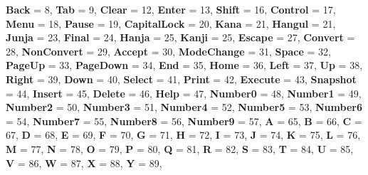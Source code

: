 \begin{DoxyCompactItemize}
{\bfseries Back} = 8, 
{\bfseries Tab} = 9, 
{\bfseries Clear} = 12, 
\newline
{\bfseries Enter} = 13, 
{\bfseries Shift} = 16, 
{\bfseries Control} = 17, 
{\bfseries Menu} = 18, 
\newline
{\bfseries Pause} = 19, 
{\bfseries Capital\+Lock} = 20, 
{\bfseries Kana} = 21, 
{\bfseries Hangul} = 21, 
\newline
{\bfseries Junja} = 23, 
{\bfseries Final} = 24, 
{\bfseries Hanja} = 25, 
{\bfseries Kanji} = 25, 
\newline
{\bfseries Escape} = 27, 
{\bfseries Convert} = 28, 
{\bfseries Non\+Convert} = 29, 
{\bfseries Accept} = 30, 
\newline
{\bfseries Mode\+Change} = 31, 
{\bfseries Space} = 32, 
{\bfseries Page\+Up} = 33, 
{\bfseries Page\+Down} = 34, 
\newline
{\bfseries End} = 35, 
{\bfseries Home} = 36, 
{\bfseries Left} = 37, 
{\bfseries Up} = 38, 
\newline
{\bfseries Right} = 39, 
{\bfseries Down} = 40, 
{\bfseries Select} = 41, 
{\bfseries Print} = 42, 
\newline
{\bfseries Execute} = 43, 
{\bfseries Snapshot} = 44, 
{\bfseries Insert} = 45, 
{\bfseries Delete} = 46, 
\newline
{\bfseries Help} = 47, 
{\bfseries Number0} = 48, 
{\bfseries Number1} = 49, 
{\bfseries Number2} = 50, 
\newline
{\bfseries Number3} = 51, 
{\bfseries Number4} = 52, 
{\bfseries Number5} = 53, 
{\bfseries Number6} = 54, 
\newline
{\bfseries Number7} = 55, 
{\bfseries Number8} = 56, 
{\bfseries Number9} = 57, 
{\bfseries A} = 65, 
\newline
{\bfseries B} = 66, 
{\bfseries C} = 67, 
{\bfseries D} = 68, 
{\bfseries E} = 69, 
\newline
{\bfseries F} = 70, 
{\bfseries G} = 71, 
{\bfseries H} = 72, 
{\bfseries I} = 73, 
\newline
{\bfseries J} = 74, 
{\bfseries K} = 75, 
{\bfseries L} = 76, 
{\bfseries M} = 77, 
\newline
{\bfseries N} = 78, 
{\bfseries O} = 79, 
{\bfseries P} = 80, 
{\bfseries Q} = 81, 
\newline
{\bfseries R} = 82, 
{\bfseries S} = 83, 
{\bfseries T} = 84, 
{\bfseries U} = 85, 
\newline
{\bfseries V} = 86, 
{\bfseries W} = 87, 
{\bfseries X} = 88, 
{\bfseries Y} = 89, 
\newline

\end{DoxyCompactItemize}
